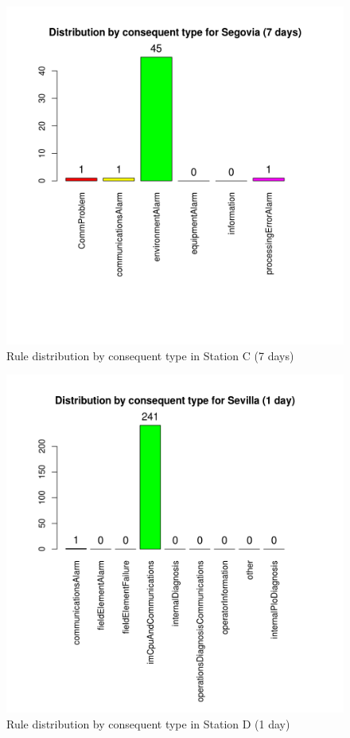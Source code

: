 \begin{figure}[hbtp]
\includegraphics[width=\textwidth]{img/conseqtypes_seg7.png}
\caption{Rule distribution by consequent type in Station C (7 days)} \label{fig:conseqtypes_seg7}
\end{figure}

\begin{figure}[hbtp]
\includegraphics[width=\textwidth]{img/conseqtypes_sev1.png}
\caption{Rule distribution by consequent type in Station D (1 day)} \label{fig:conseqtypes_sev1}
\end{figure}


